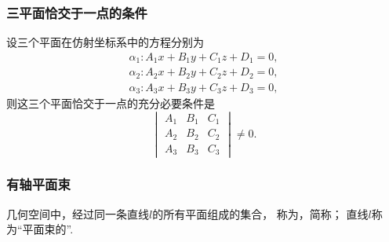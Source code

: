 \subsubsection{三平面恰交于一点的条件}
\begin{theorem}
设三个平面在仿射坐标系中的方程分别为\[
	\begin{split}
		\alpha_1: A_1 x + B_1 y + C_1 z + D_1 = 0, \\
		\alpha_2: A_2 x + B_2 y + C_2 z + D_2 = 0, \\
		\alpha_3: A_3 x + B_3 y + C_3 z + D_3 = 0,
	\end{split}
\]
则这三个平面恰交于一点的充分必要条件是\[
	\begin{vmatrix}
		A_1 & B_1 & C_1 \\
		A_2 & B_2 & C_2 \\
		A_3 & B_3 & C_3
	\end{vmatrix}
	\neq 0.
\]
\end{theorem}

\subsubsection{有轴平面束}
几何空间中，经过同一条直线\(l\)的所有平面组成的集合，
称为，简称；
直线\(l\)称为“平面束的”.

